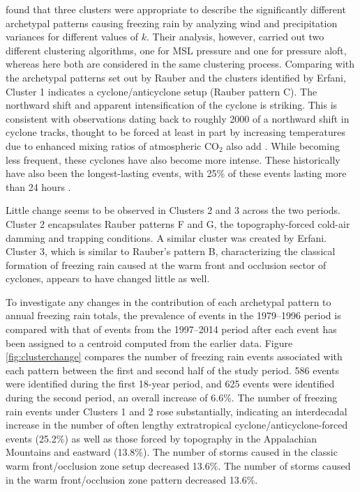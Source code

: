 \documentclass[twocol]{ametsoc}
\begin{document}
\citet{erfani2012automated} found that three clusters were appropriate to describe the significantly different archetypal patterns causing freezing rain by analyzing wind and precipitation variances for different values of $k$. Their analysis, however, carried out two different clustering algorithms, one for MSL pressure and one for pressure aloft, whereas here both are considered in the same clustering process. 
Comparing with the archetypal patterns set out by Rauber and the clusters identified by Erfani, Cluster 1 indicates a cyclone/anticyclone setup (Rauber pattern C). The northward shift and apparent intensification of the cyclone is striking. This is consistent with observations dating back to roughly 2000 of a northward shift in cyclone tracks, thought to be forced at least in part by increasing temperatures due to enhanced mixing ratios of atmospheric CO$_2$ \citep{mccabe2001trends} also add \citep{chang2016northern}. While becoming less frequent, these cyclones have also become more intense. These historically have also been the longest-lasting events, with 25\% of these events lasting more than 24 hours \citep{rauber2001synoptic}. 

Little change seems to be observed in Clusters 2 and 3 across the two periods. Cluster 2 encapsulates Rauber patterns F and G, the topography-forced cold-air damming and trapping conditions. A similar cluster was created by Erfani. Cluster 3, which is similar to Rauber's pattern B, characterizing the classical formation of freezing rain caused at the warm front and occlusion sector of cyclones, appears to have changed little as well.

To investigate any changes in the contribution of each archetypal pattern to annual freezing rain totals, the prevalence of events in the 1979--1996 period is compared with that of events from the 1997--2014 period after each event has been assigned to a centroid computed from the earlier data. Figure \ref{fig:clusterchange} compares the number of freezing rain events associated with each pattern between the first and second half of the study period. 586 events were identified during the first 18-year period, and 625 events were identified during the second period, an overall increase of 6.6\%. The number of freezing rain events under Clusters 1 and 2  rose substantially, indicating an interdecadal increase in the number of often lengthy extratropical cyclone/anticyclone-forced events (25.2\%) as well as those forced by topography in the Appalachian Mountains and eastward (13.8\%). The number of storms caused in the classic warm front/occlusion zone setup decreased 13.6\%.  The number of storms caused in the warm front/occlusion zone pattern decreased 13.6\%. 
\end{document}
